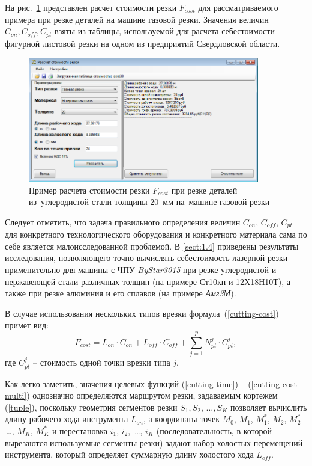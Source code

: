 \documentclass[11pt,twoside,openany]{report}
\begin{document}
На рис.~\ref{cost} представлен расчет стоимости резки
$F_{cost}$
для рассматриваемого примера при резке деталей на машине газовой резки.
Значения величин
$C_{on}, C_{off}, C_{pt}$
взяты из таблицы, используемой для расчета себестоимости фигурной
листовой резки на одном из предприятий Свердловской области.

\begin{figure}[h]
  \begin{center}
  \includegraphics[width=0.9\textwidth]{cost.png}
  \caption{
    Пример расчета стоимости резки $F_{cost}$
    при резке деталей из~углеродистой стали
    толщины 20~мм на~машине газовой резки}
  \label{cost}
  \end{center}
\end{figure}

Следует отметить,
что задача правильного определения величин
$C_{on}$, $C_{off}$, $C_{pt}$
для конкретного технологического оборудования
и конкретного материала сама по себе является малоисследованной проблемой.
В \ref{sect:1.4}
приведены результаты исследования,
позволяющего точно вычислять себестоимость
лазерной резки применительно для машины с ЧПУ
\textit{ByStar3015}
при резке углеродистой и нержавеющей
стали различных толщин
(на примере Ст10кп и 12Х18Н10Т),
а также при резке алюминия и его сплавов
(на примере \textit{Амг3М}).

В случае использования нескольких типов врезки формула~(\ref{cutting-cost}) примет вид:
\begin{equation}
  F_{cost}=
  L_{on} \cdot C_{on} +
  L_{off} \cdot C_{off} +
  \sum_{j=1}^p N_{pt}^j \cdot C_{pt}^j
  ,
  \label{cutting-cost-multi}
\end{equation}
где $C_{pt}^j$ -- стоимость одной точки врезки типа $j$.

Как легко заметить,
значения целевых функций (\ref{cutting-time}) -- (\ref{cutting-cost-multi})
однозначно определяются маршрутом резки,
задаваемым кортежем (\ref{tuple}),
поскольку геометрия сегментов резки
$S_1, S_2, \,\dots, S_K$
позволяет вычислить длину рабочего хода инструмента  $L_{on}$,
а координаты точек
$M_0$, $M_1$, $M_1^*$, $M_2$, $M_2^*$ \,\dots, $M_K$, $M_K^*$
и перестановка
$i_1$, $i_2$, \,\dots, $i_K$
(последовательность, в которой вырезаются используемые сегменты резки)
задают набор холостых перемещений инструмента,
который определяет суммарную длину холостого хода
$L_{off}$.
\end{document}
